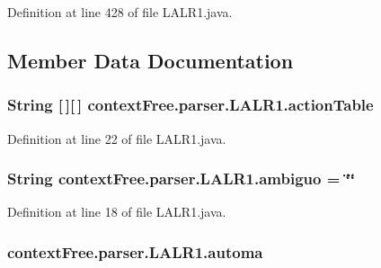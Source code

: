 Definition at line 428 of file L\-A\-L\-R1.\-java.



\subsection{Member Data Documentation}
\hypertarget{classcontext_free_1_1parser_1_1_l_a_l_r1_a50a59810900d20102a28766aad917b79}{
\subsubsection[{action\-Table}]{\setlength{\rightskip}{0pt plus 5cm}String \mbox{[}$\,$\mbox{]}\mbox{[}$\,$\mbox{]} {\bf context\-Free.\-parser.\-L\-A\-L\-R1.\-action\-Table}}}\label{classcontext_free_1_1parser_1_1_l_a_l_r1_a50a59810900d20102a28766aad917b79}


Definition at line 22 of file L\-A\-L\-R1.\-java.

\hypertarget{classcontext_free_1_1parser_1_1_l_a_l_r1_ac76b78ae26e1f59674ae10b9c1059213}{
\subsubsection[{ambiguo}]{\setlength{\rightskip}{0pt plus 5cm}String {\bf context\-Free.\-parser.\-L\-A\-L\-R1.\-ambiguo} = \char`\"{}\char`\"{}}}\label{classcontext_free_1_1parser_1_1_l_a_l_r1_ac76b78ae26e1f59674ae10b9c1059213}


Definition at line 18 of file L\-A\-L\-R1.\-java.

\hypertarget{classcontext_free_1_1parser_1_1_l_a_l_r1_ab6054628eaec08e8b3b77a37e219ef02}{
\subsubsection[{automa}]{ {\bf context\-Free.\-parser.\-L\-A\-L\-R1.\-automa}}}\label{classcontext_free_1_1parser_1_1_l_a_l_r1_ab6054628eaec08e8b3b77a37e219ef02}


